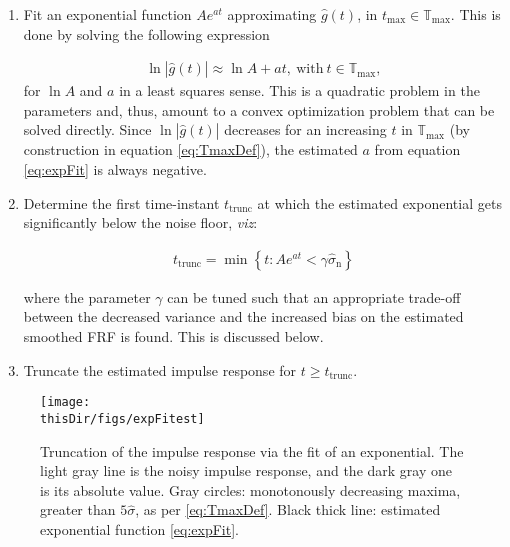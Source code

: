 \begin{enumerate}
\item Fit an exponential function $Ae^{at}$ approximating $\hat g(t)$, in $t_\mathrm{max}\in\mathbb{T}_\mathrm{max}$. This is done by solving the following expression

\begin{align}\label{eq:expFit}
\ln \left|\hat g(t)\right|\approx \ln A+at,\ \mathrm{with}\ t\in\mathbb{T}_\mathrm{max},
\end{align}
for $\ln A$ and $a$ in a least squares sense. 
This is a quadratic problem in the parameters and, thus, amount to a convex optimization problem that can be solved directly.
Since  $\ln \left|\hat g(t)\right|$ decreases for an increasing $t$ in $\mathbb{T}_\mathrm{max}$ (by construction in equation \eqref{eq:TmaxDef}), the estimated $a$ from equation \eqref{eq:expFit} is always negative.

\item
Determine the first time-instant $t_\mathrm{trunc}$ at which the estimated exponential gets significantly below the noise floor, \emph{viz}:

\begin{align}\label{eq:truncTimeExpFit}
t_\mathrm{trunc} = \min \left\{t:Ae^{at} < \gamma\hat\sigma_\mathrm{n}\right\}
\end{align}

\noindent
where the parameter $\gamma$ can be tuned such that an appropriate trade-off between the decreased variance and the increased bias on the estimated smoothed FRF is found. This is discussed below. %

\item
 Truncate the estimated impulse response for $t \geqslant t_\mathrm{trunc}$.

\end{enumerate}

\begin{figure}[tbh] %
\centering

\texttt{[image: \\thisDir/figs/expFitest]}
\caption{Truncation of the impulse response via the fit of  an exponential. The light gray line is the noisy impulse response, and the dark gray one is its absolute value. Gray circles: monotonously decreasing maxima, greater than $5\hat\sigma$, as per \eqref{eq:TmaxDef}. Black thick line: estimated exponential function \eqref{eq:expFit}.}
\label{FRF_truncate_expfitter}
\end{figure}

